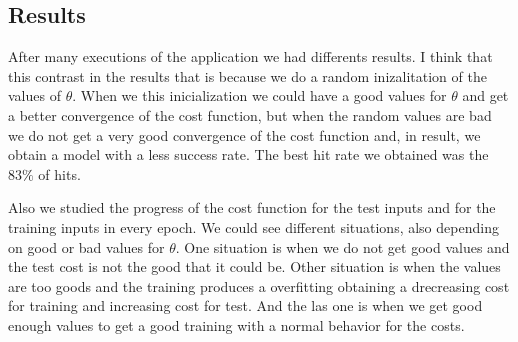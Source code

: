 \documentclass[12pt]{article}
\begin{document}
\subsection{Results}
After many executions of the application we had differents results. I think that this contrast in the results that is because we do a random inizalitation of the values of $\theta$. When we this inicialization we could have a good values for $\theta$ and get a better convergence of the cost function, but when the random values are bad we do not get a very good convergence of the cost function and, in result, we obtain a model with a less success rate. The best hit rate we obtained was the $83\%$ of hits.

Also we studied the progress of the cost function for the test inputs and for the training inputs in every epoch. We could see different situations, also depending on good or bad values for $\theta$. One situation is when we do not get good values and the  test cost is not the good that it could be. Other situation is when the values are too goods and the training produces a overfitting obtaining a drecreasing cost for training and increasing cost for test. And the las one is when we get good enough values to get a good training with a normal behavior for the costs.
\end{document}
